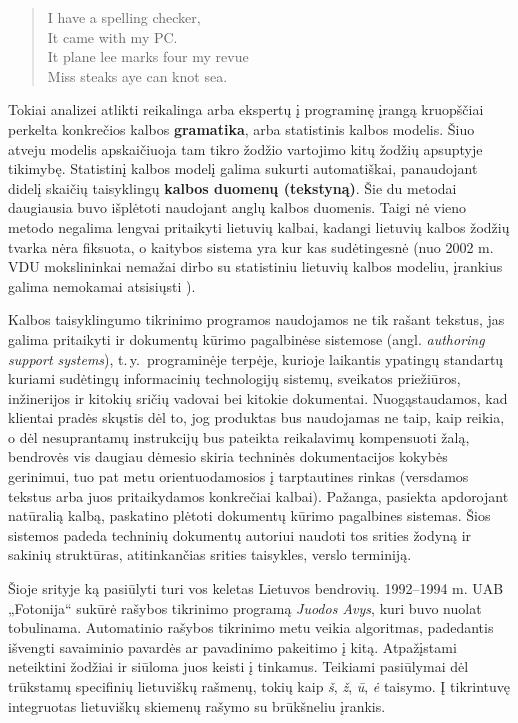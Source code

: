 \begin{multicols}{2}
\begin{quote}
  I have a spelling checker,\\
  It came with my PC.\\
  It plane lee marks four my revue\\
  Miss steaks aye can knot sea.
\end{quote}

Tokiai analizei atlikti reikalinga arba ekspertų į programinę įrangą kruopščiai perkelta konkrečios kalbos \textbf{gramatika}, arba statistinis kalbos modelis. Šiuo atveju modelis apskaičiuoja tam tikro žodžio vartojimo kitų žodžių apsuptyje tikimybę. Statistinį kalbos modelį galima sukurti automatiškai, panaudojant didelį skaičių taisyklingų \textbf{kalbos duomenų (tekstyną)}. Šie du metodai daugiausia buvo išplėtoti naudojant anglų kalbos duomenis. Taigi nė vieno metodo negalima lengvai pritaikyti lietuvių kalbai, kadangi lietuvių kalbos žodžių tvarka nėra fiksuota, o kaitybos sistema yra kur kas sudėtingesnė (nuo 2002 m. VDU mokslininkai nemažai dirbo su statistiniu lietuvių kalbos modeliu, įrankius galima nemokamai atsisiųsti \cite{airenas}).   


Kalbos taisyklingumo tikrinimo programos naudojamos ne tik rašant tekstus, jas galima pritaikyti ir dokumentų kūrimo pagalbinėse sistemose (angl. \textit{authoring support systems}), t.\,y.~programinėje terpėje, kurioje laikantis ypatingų standartų kuriami sudėtingų informacinių technologijų sistemų, sveikatos priežiūros, inžinerijos ir kitokių sričių vadovai bei kitokie dokumentai. Nuogąstaudamos, kad klientai pradės skųstis dėl to, jog produktas bus naudojamas ne taip, kaip reikia, o dėl nesuprantamų instrukcijų bus pateikta reikalavimų kompensuoti žalą, bendrovės vis daugiau dėmesio skiria techninės dokumentacijos kokybės gerinimui, tuo pat metu orientuodamosios į tarptautines rinkas (versdamos tekstus arba juos pritaikydamos konkrečiai kalbai). Pažanga, pasiekta apdorojant natūralią kalbą, paskatino plėtoti dokumentų kūrimo pagalbines sistemas. Šios sistemos padeda techninių dokumentų autoriui naudoti tos srities žodyną ir sakinių struktūras, atitinkančias srities taisykles, verslo terminiją.



Šioje srityje ką pasiūlyti turi vos keletas Lietuvos bendrovių. 1992–1994 m. UAB „Fotonija“ sukūrė rašybos tikrinimo programą \textit{Juodos Avys}, kuri buvo nuolat tobulinama. Automatinio rašybos tikrinimo metu veikia algoritmas, padedantis išvengti savaiminio pavardės ar pavadinimo pakeitimo į kitą. Atpažįstami neteiktini žodžiai ir siūloma juos keisti į tinkamus. Teikiami pasiūlymai dėl trūkstamų specifinių lietuviškų rašmenų, tokių kaip \textit{š}, \textit{ž},  \textit{ū}, \textit{ė} taisymo. Į tikrintuvę integruotas lietuviškų skiemenų rašymo su brūkšneliu įrankis.   


\end{multicols}

